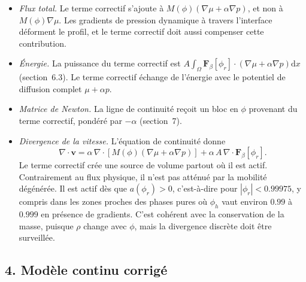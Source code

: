 \begin{itemize}
  \item \emph{Flux total.} Le terme correctif s'ajoute à $M(\phi)\left(\nabla\mu+\alpha\nabla p\right)$, et non à $M(\phi)\nabla\mu$. Les gradients de pression dynamique à travers l'interface déforment le profil, et le terme correctif doit aussi compenser cette contribution.
  \item \emph{Énergie.} La puissance du terme correctif est $A\int_\Omega \mathbf{F}_\beta[\phi_r]\cdot\left(\nabla\mu+\alpha\nabla p\right)\mathrm{d}x$ (section~6.3). Le terme correctif échange de l'énergie avec le potentiel de diffusion complet $\mu+\alpha p$.
  \item \emph{Matrice de Newton.} La ligne de continuité reçoit un bloc en $\phi$ provenant du terme correctif, pondéré par $-\alpha$ (section~7).
  \item \emph{Divergence de la vitesse.} L'équation de continuité donne
  \begin{equation}
    \nabla\cdot\mathbf{v} = \alpha\,\nabla\cdot\left[M(\phi)\left(\nabla\mu+\alpha\nabla p\right)\right] + \alpha\,A\,\nabla\cdot\mathbf{F}_\beta[\phi_r].
  \end{equation}
  Le terme correctif crée une source de volume partout où il est actif. Contrairement au flux physique, il n'est pas atténué par la mobilité dégénérée. Il est actif dès que $a(\phi_r)>0$, c'est-à-dire pour $|\phi_r|<0.99975$, y compris dans les zones proches des phases pures où $\phi_h$ vaut environ $0.99$ à $0.999$ en présence de gradients. C'est cohérent avec la conservation de la masse, puisque $\rho$ change avec $\phi$, mais la divergence discrète doit être surveillée.
\end{itemize}

\subsection*{4. Modèle continu corrigé}

